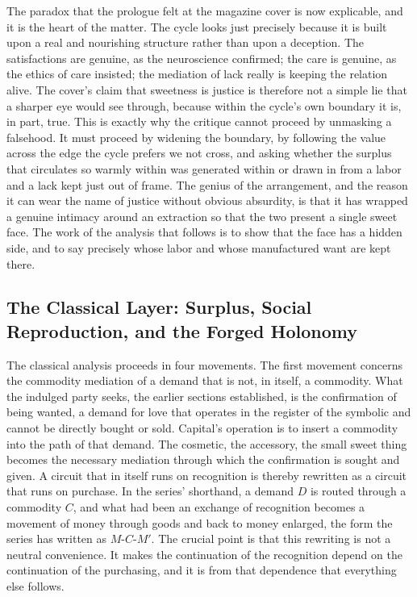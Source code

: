The paradox that the prologue felt at the magazine cover is now explicable, and it is the heart of the matter. The cycle looks just precisely because it is built upon a real and nourishing structure rather than upon a deception. The satisfactions are genuine, as the neuroscience confirmed; the care is genuine, as the ethics of care insisted; the mediation of lack really is keeping the relation alive. The cover's claim that sweetness is justice is therefore not a simple lie that a sharper eye would see through, because within the cycle's own boundary it is, in part, true. This is exactly why the critique cannot proceed by unmasking a falsehood. It must proceed by widening the boundary, by following the value across the edge the cycle prefers we not cross, and asking whether the surplus that circulates so warmly within was generated within or drawn in from a labor and a lack kept just out of frame. The genius of the arrangement, and the reason it can wear the name of justice without obvious absurdity, is that it has wrapped a genuine intimacy around an extraction so that the two present a single sweet face. The work of the analysis that follows is to show that the face has a hidden side, and to say precisely whose labor and whose manufactured want are kept there.

\subsection{The Classical Layer: Surplus, Social Reproduction, and the Forged Holonomy}

The classical analysis proceeds in four movements. The first movement concerns the commodity mediation of a demand that is not, in itself, a commodity. What the indulged party seeks, the earlier sections established, is the confirmation of being wanted, a demand for love that operates in the register of the symbolic and cannot be directly bought or sold. Capital's operation is to insert a commodity into the path of that demand. The cosmetic, the accessory, the small sweet thing becomes the necessary mediation through which the confirmation is sought and given. A circuit that in itself runs on recognition is thereby rewritten as a circuit that runs on purchase. In the series' shorthand, a demand $D$ is routed through a commodity $C$, and what had been an exchange of recognition becomes a movement of money through goods and back to money enlarged, the form the series has written as $M$-$C$-$M'$. The crucial point is that this rewriting is not a neutral convenience. It makes the continuation of the recognition depend on the continuation of the purchasing, and it is from that dependence that everything else follows.

